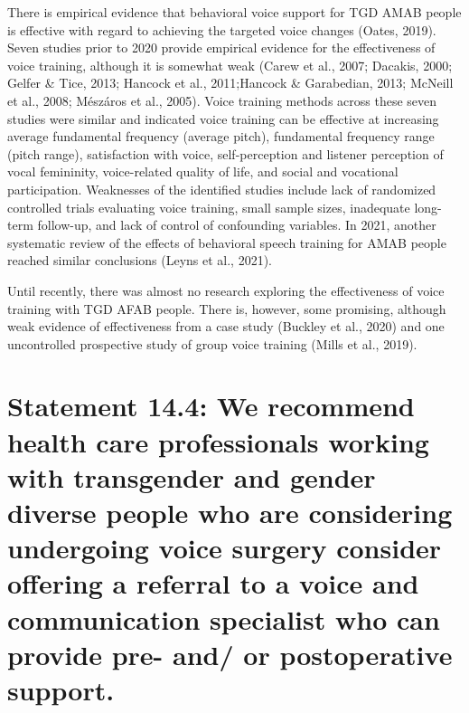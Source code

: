 \documentclass[
]{book}
\begin{document}
There is empirical evidence that behavioral
voice support for TGD AMAB people is effective
with regard to achieving the targeted voice
changes (Oates, 2019). Seven studies prior to
2020 provide empirical evidence for the effectiveness of voice training, although it is somewhat
weak (Carew et al., 2007; Dacakis, 2000; Gelfer
\& Tice, 2013; Hancock et al., 2011;Hancock \&
Garabedian, 2013; McNeill et al., 2008; Mészáros
et al., 2005). Voice training methods across these
seven studies were similar and indicated voice
training can be effective at increasing average
fundamental frequency (average pitch), fundamental frequency range (pitch range), satisfaction
with voice, self-perception and listener perception
of vocal femininity, voice-related quality of life,
and social and vocational participation.
Weaknesses of the identified studies include lack
of randomized controlled trials evaluating voice
training, small sample sizes, inadequate long-term
follow-up, and lack of control of confounding
variables. In 2021, another systematic review of
the effects of behavioral speech training for
AMAB people reached similar conclusions (Leyns
et al., 2021).

Until recently, there was almost no research
exploring the effectiveness of voice training with
TGD AFAB people. There is, however, some
promising, although weak evidence of effectiveness from a case study (Buckley et al., 2020) and
one uncontrolled prospective study of group voice
training (Mills et al., 2019).

\hypertarget{statement-14.4-we-recommend-health-care-professionals-working-with-transgender-and-gender-diverse-people-who-are-considering-undergoing-voice-surgery-consider-offering-a-referral-to-a-voice-and-communication-specialist-who-can-provide-pre--and-or-postoperative-support.}{%
\section*{Statement 14.4: We recommend health care professionals working with transgender and gender diverse people who are considering undergoing voice surgery consider offering a referral to a voice and communication specialist who can provide pre- and/ or postoperative support.}\label{statement-14.4-we-recommend-health-care-professionals-working-with-transgender-and-gender-diverse-people-who-are-considering-undergoing-voice-surgery-consider-offering-a-referral-to-a-voice-and-communication-specialist-who-can-provide-pre--and-or-postoperative-support.}}
\end{document}
